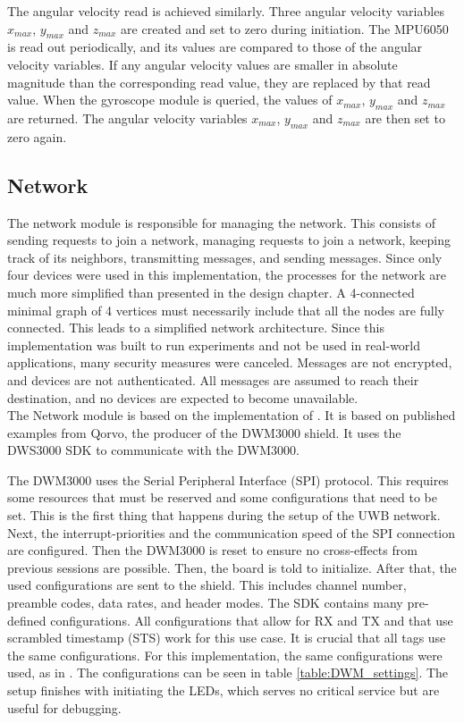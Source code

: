 The angular velocity read is achieved similarly.
Three angular velocity variables $x_{max}$, $y_{max}$ and $z_{max}$ are created and set to zero during initiation.
The MPU6050 is read out periodically, and its values are compared to those of the angular velocity variables.
If any angular velocity values are smaller in absolute magnitude than the corresponding read value, they are replaced by that read value.
When the gyroscope module is queried, the values of $x_{max}$, $y_{max}$ and $z_{max}$ are returned.
The angular velocity variables $x_{max}$, $y_{max}$ and $z_{max}$ are then set to zero again.

\subsection{Network}
\label{s:network}
The network module is responsible for managing the network.
This consists of sending requests to join a network, managing requests to join a network, keeping track of its neighbors, transmitting messages, and sending messages.
Since only four devices were used in this implementation, the processes for the network are much more simplified than presented in the design chapter.
A 4-connected minimal graph of 4 vertices must necessarily include that all the nodes are fully connected.
This leads to a simplified network architecture.
Since this implementation was built to run experiments and not be used in real-world applications, many security measures were canceled.
Messages are not encrypted, and devices are not authenticated.
All messages are assumed to reach their destination, and no devices are expected to become unavailable. \\
The Network module is based on the implementation of \cite{degkwitz2023ultrawideband}.
It is based on published examples from Qorvo, the producer of the DWM3000 shield.
It uses the DWS3000 SDK to communicate with the DWM3000.


The DWM3000 uses the Serial Peripheral Interface (SPI) protocol.
This requires some resources that must be reserved and some configurations that need to be set.
This is the first thing that happens during the setup of the UWB network.
Next, the interrupt-priorities and the communication speed of the SPI connection are configured.
Then the DWM3000 is reset to ensure no cross-effects from previous sessions are possible.
Then, the board is told to initialize.
After that, the used configurations are sent to the shield.
This includes channel number, preamble codes, data rates, and header modes.
The SDK contains many pre-defined configurations.
All configurations that allow for RX and TX and that use scrambled timestamp (STS) work for this use case.
It is crucial that all tags use the same configurations.
For this implementation, the same configurations were used, as in \cite{degkwitz2023ultrawideband}.
The configurations can be seen in table \ref{table:DWM_settings}.
The setup finishes with initiating the LEDs, which serves no critical service but are useful for debugging.



